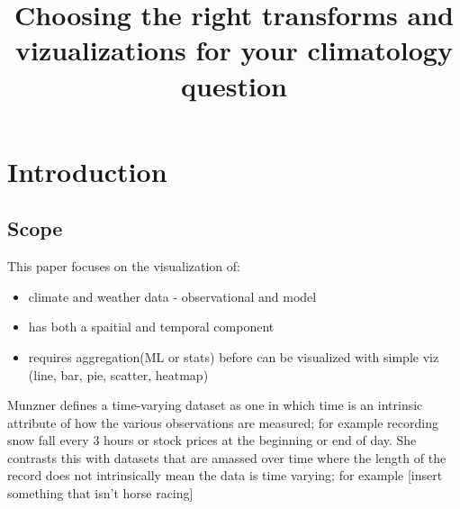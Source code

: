 \documentclass[letterpaper,onecolumn,titlepage]{Ythesis}
\title{Choosing the right transforms and vizualizations for your climatology question}
\begin{document}
\makefrontmatter

\section{Introduction}


\subsection{Scope}

This paper focuses on the visualization of:
\begin{itemize}
\item climate and weather data - observational and model
\item has both a spaitial and temporal component
\item requires aggregation(ML or stats) before can be visualized with simple viz (line, bar, pie, scatter, heatmap)
\end{itemize}





Munzner \cite{Munzner14} defines a time-varying dataset as one in which time is an intrinsic attribute of how the various observations are measured; for example recording snow fall every 3 hours or stock prices at the beginning or end of day. She contrasts this with datasets that are amassed over time where the length of the record does not intrinsically mean the data is time varying; for example [insert something that isn't horse racing] 
\end{document}
